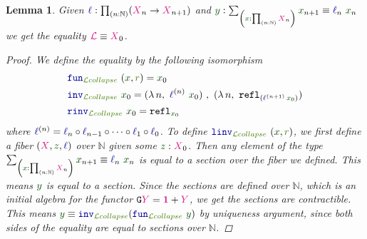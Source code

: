 \documentclass[twoside,11pt,openright]{report}
\theoremstyle{plain} %
\newtheorem{lem}[thm]{Lemma}
\theoremstyle{definition}
\theoremstyle{remark}
\newcommand*{\term}[1]{\textcolor{green!30!black}{#1}} %
\newcommand*{\pathterm}[1]{\textcolor{green!65!red!75!black}{#1}}
\newcommand*{\type}[1]{\textcolor{magenta!90!black}{#1}}
\newcommand*{\unit}{\type{\textbf{1}}}
\newcommand*{\function}[1]{\textcolor{blue!60!black}{\ensuremath{\mathtt{#1}}}}
\newcommand*{\functor}[1]{\ensuremath{\mathbf{\mathtt{#1}}}}
\begin{document}
\begin{lem}
  \label{lem:limit-collapse}
  Given \(\function{\ell} : \prod_{(n : \mathbb{N})} (\type{X}_{n} \rightarrow \type{X}_{n+1})\) and \(\term{y} : \sum_{\left(\term{x} : \prod_{(n : \mathbb{N})} \type{X}_n\right)} \term{x}_{n + 1} \equiv \function{\ell}_n~\term{x}_n\) we get the equality \(\type{\mathcal{L}} \equiv \type{X}_0\).
  \begin{proof}
    We define the equality by the following isomorphism
    \begin{align}
      &\function{fun}_{\pathterm{\mathcal{L}collapse}}~(\term{x} , \pathterm{r}) = \term{x}_0 \\
      &\function{inv}_{\pathterm{\mathcal{L}collapse}}~\term{x}_0 = (\lambda\,n,~\function{\ell}^{(n)}~\term{x}_0)~,~(\lambda\,n,~\mathtt{refl}_{(\function{\ell}^{(n+1)}\,\term{x}_0)}) \\
      &\function{rinv}_{\pathterm{\mathcal{L}collapse}}~\term{x}_0 = \mathtt{refl}_{\term{x}_0}
    \end{align}
    where \(\function{\ell}^{(n)} = \function{\ell}_n \circ \function{\ell}_{n-1} \circ \dots \circ \function{\ell}_1 \circ \function{\ell}_0\). To define \(\function{linv}_{\pathterm{\mathcal{L}collapse}}~(\term{x} , \pathterm{r})\), we first define a fiber \((\type{X} , \term{z}, \function{\ell})\) over \(\mathbb{N}\) given some \(\term{z} : \type{X}_0\). Then any element of the type \(\sum_{\left(\term{x} : \prod_{(n : \mathbb{N})} \type{X}_n\right)} \term{x}_{n + 1} \equiv \function{\ell}_n~\term{x}_n\) is equal to a section over the fiber we defined. This means \(\term{y}\) is equal to a section. Since the sections are defined over \(\mathbb{N}\), which is an initial algebra for the functor \(\functor{G}\type{Y} = \unit + \type{Y}\), we get the sections are contractible. This means \(\term{y} \equiv \function{inv}_{\pathterm{\mathcal{L}collapse}} (\function{fun}_{\pathterm{\mathcal{L}collapse}}~\term{y})\) by uniqueness argument, since both sides of the equality are equal to sections over \(\mathbb{N}\).
\end{proof}
\end{lem}
\end{document}
